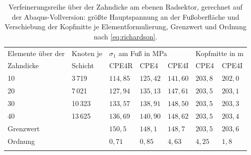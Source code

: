\begin{table}[htbp]
	\centering
	\caption{Verfeinerungsreihe über der Zahndicke am ebenen Radsektor, gerechnet auf der Abaqus-Vollversion: größte Hauptspannung an der Fußoberfläche und Verschiebung der Kopfmitte je Elementformulierung, Grenzwert und Ordnung nach \eqref{eq:richardson}.}
	\label{tab:netzleiter}
	\begin{tabular}{lllllll}
		\hline
		Elemente über der & Knoten je & \multicolumn{3}{l}{$\sigma_{\mathrm{1}}$ am Fuß in MPa} & \multicolumn{2}{l}{Kopfmitte in \textmu m}                                      \\
		Zahndicke         & Schicht   & CPE4R                                                   & CPE4                                       & CPE4I      & CPE4      & CPE4I     \\
		\hline
		\arrayrulecolor{black!30}
		10                & 3\,719    & $114{,}85$                                              & $125{,}42$                                 & $141{,}60$ & $203{,}8$ & $202{,}0$ \\
		\hline
		20                & 7\,021    & $127{,}94$                                              & $135{,}13$                                 & $147{,}61$ & $203{,}5$ & $203{,}1$ \\
		\hline
		30                & 10\,323   & $133{,}57$                                              & $138{,}91$                                 & $148{,}50$ & $203{,}5$ & $203{,}3$ \\
		\hline
		40                & 13\,625   & $136{,}69$                                              & $140{,}90$                                 & $148{,}62$ & $203{,}5$ & $203{,}4$ \\
		\hline
		Grenzwert         &           & $150{,}5$                                               & $148{,}1$                                  & $148{,}7$  & $203{,}5$ & $203{,}6$ \\
		\hline
		Ordnung           &           & $0{,}71$                                                & $0{,}85$                                   & $4{,}63$   & $4{,}25$  & $1{,}8$   \\
		\arrayrulecolor{black}
		\hline
	\end{tabular}
\end{table}

